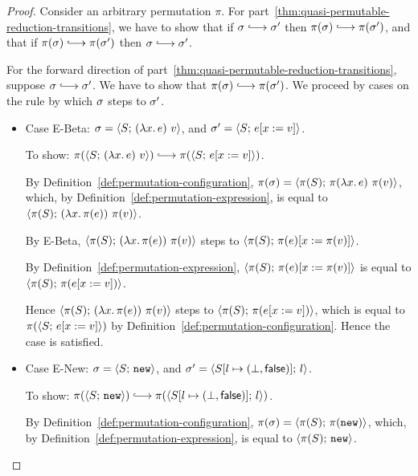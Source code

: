 \begin{proof}
  Consider an arbitrary permutation $\pi$.  For
  part~\ref{thm:quasi-permutable-reduction-transitions}, we have to
  show that if $\conf \parstepsto \conf'$ then $\pi(\conf) \parstepsto
  \pi(\conf')$, and that if $\pi(\conf) \parstepsto \pi(\conf')$ then
  $\conf \parstepsto \conf'$.

  For the forward direction of
  part~\ref{thm:quasi-permutable-reduction-transitions}, suppose
  $\conf \parstepsto \conf'$.  We have to show that $\pi(\conf)
  \parstepsto \pi(\conf')$.  We proceed by cases on the rule by which
  $\sigma$ steps to $\sigma'$.

  \begin{itemize}
    \item Case {\sc E-Beta}: $\sigma =
      \langle S;\, (\lambda x.\,e)~v \rangle$, and $\sigma' =
      \langle S;\, e[x := v] \rangle$.

      To show: $\pi(\config{S}{\app{(\lam{x}{e})}{v}}) \parstepsto
      \pi(\config{S}{\subst{e}{x}{v}})$.

      By Definition~\ref{def:permutation-configuration}, $\pi(\sigma) =
      \langle \pi(S);\, \pi(\lambda x.\,e)~\pi(v) \rangle$, which, by
      Definition~\ref{def:permutation-expression}, is equal to
      $\langle \pi(S);\, (\lambda x.\,\pi(e))~\pi(v) \rangle$.

      By {\sc E-Beta},
      $\langle \pi(S);\, (\lambda x.\,\pi(e))~\pi(v) \rangle$ steps to
      $\langle \pi(S);\, \pi(e)[x := \pi(v)] \rangle$.

      By Definition~\ref{def:permutation-expression},
      $\langle \pi(S);\, \pi(e)[x := \pi(v)] \rangle$ is equal to
      $\langle \pi(S);\, \pi(e[x := v]) \rangle$.

      Hence $\langle \pi(S);\, (\lambda x.\,\pi(e))~\pi(v) \rangle$ steps
      to $\langle \pi(S);\, \pi(e[x := v]) \rangle$, which is equal to
      $\pi(\langle S;\, e[x := v] \rangle)$ by
      Definition~\ref{def:permutation-configuration}.  Hence the case
      is satisfied.

    \item Case {\sc E-New}: $\sigma = \langle S;\, \mbox{\texttt{new}} \rangle$, and $\sigma' =
      \langle S[l \mapsto (\bot, \textsf{false})];\, l \rangle$.

      To show: $\pi(\config{S}{\NEW}) \parstepsto
      \pi(\config{\extS{S}{l}{\bot}{\frozenfalse}}{l})$.

      By Definition~\ref{def:permutation-configuration}, $\pi(\sigma) =
      \langle \pi(S);\, \pi(\mbox{\texttt{new}}) \rangle$, which, by
      Definition~\ref{def:permutation-expression}, is equal to
      $\langle \pi(S);\, \mbox{\texttt{new}} \rangle$.


\end{itemize}
\end{proof}
